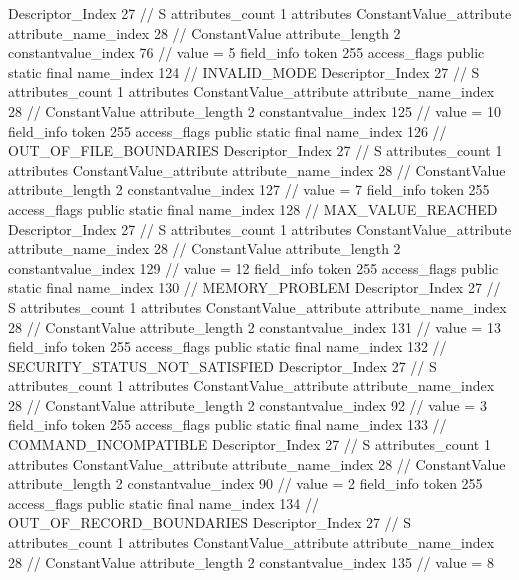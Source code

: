 {{{{{				Descriptor_Index	27		// S
				attributes_count	1
				attributes {
				ConstantValue_attribute {
					attribute_name_index	28		// ConstantValue
					attribute_length	2
					constantvalue_index	76		// value = 5
				}
				}
			}
			field_info {
				token	255
				access_flags	public static final
				name_index	124		// INVALID_MODE
				Descriptor_Index	27		// S
				attributes_count	1
				attributes {
				ConstantValue_attribute {
					attribute_name_index	28		// ConstantValue
					attribute_length	2
					constantvalue_index	125		// value = 10
				}
				}
			}
			field_info {
				token	255
				access_flags	public static final
				name_index	126		// OUT_OF_FILE_BOUNDARIES
				Descriptor_Index	27		// S
				attributes_count	1
				attributes {
				ConstantValue_attribute {
					attribute_name_index	28		// ConstantValue
					attribute_length	2
					constantvalue_index	127		// value = 7
				}
				}
			}
			field_info {
				token	255
				access_flags	public static final
				name_index	128		// MAX_VALUE_REACHED
				Descriptor_Index	27		// S
				attributes_count	1
				attributes {
				ConstantValue_attribute {
					attribute_name_index	28		// ConstantValue
					attribute_length	2
					constantvalue_index	129		// value = 12
				}
				}
			}
			field_info {
				token	255
				access_flags	public static final
				name_index	130		// MEMORY_PROBLEM
				Descriptor_Index	27		// S
				attributes_count	1
				attributes {
				ConstantValue_attribute {
					attribute_name_index	28		// ConstantValue
					attribute_length	2
					constantvalue_index	131		// value = 13
				}
				}
			}
			field_info {
				token	255
				access_flags	public static final
				name_index	132		// SECURITY_STATUS_NOT_SATISFIED
				Descriptor_Index	27		// S
				attributes_count	1
				attributes {
				ConstantValue_attribute {
					attribute_name_index	28		// ConstantValue
					attribute_length	2
					constantvalue_index	92		// value = 3
				}
				}
			}
			field_info {
				token	255
				access_flags	public static final
				name_index	133		// COMMAND_INCOMPATIBLE
				Descriptor_Index	27		// S
				attributes_count	1
				attributes {
				ConstantValue_attribute {
					attribute_name_index	28		// ConstantValue
					attribute_length	2
					constantvalue_index	90		// value = 2
				}
				}
			}
			field_info {
				token	255
				access_flags	public static final
				name_index	134		// OUT_OF_RECORD_BOUNDARIES
				Descriptor_Index	27		// S
				attributes_count	1
				attributes {
				ConstantValue_attribute {
					attribute_name_index	28		// ConstantValue
					attribute_length	2
					constantvalue_index	135		// value = 8
}}}}}}}
